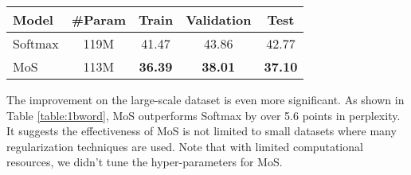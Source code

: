 
\begin{table*}[!h]
	\small
	\centering
	\begin{tabular}{l|c|ccc}
		\toprule
		\bf Model & \bf \#Param & \bf Train & \bf Validation & \bf Test \\
		\midrule
		Softmax & 119M & 41.47       & 43.86      & 42.77      \\
		MoS       & 113M & \bf 36.39 & \bf 38.01 & \bf 37.10 \\
		\bottomrule
	\end{tabular}
	\caption{\small Perplexity comparison on 1B word dataset. Train perplexity is the average of the last 4,000 updates.}
	\label{table:1bword}
	\vspace{-1em}
\end{table*}
The improvement on the large-scale dataset is even more significant. As shown in Table \ref{table:1bword}, MoS outperforms Softmax by over 5.6 points in perplexity. It suggests the effectiveness of MoS is not limited to small datasets where many regularization techniques are used. Note that with limited computational resources, we didn't tune the hyper-parameters for MoS. 

